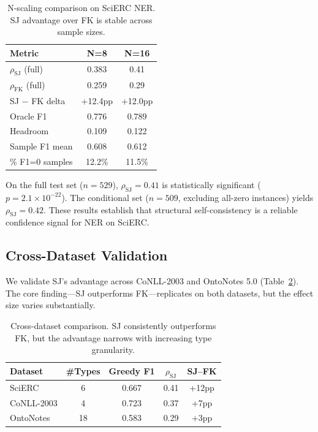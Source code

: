 \documentclass[11pt]{article}
\begin{document}
\begin{table}[t]
\centering
\caption{N-scaling comparison on SciERC NER. SJ advantage over FK is stable across sample sizes.}
\label{tab:n_scaling}
\begin{tabular}{lcc}
\toprule
\textbf{Metric} & \textbf{N=8} & \textbf{N=16} \\
\midrule
$\rho_{\text{SJ}}$ (full)     & 0.383 & 0.41 \\
$\rho_{\text{FK}}$ (full)     & 0.259 & 0.29 \\
SJ $-$ FK delta               & +12.4pp & +12.0pp \\
Oracle F1                     & 0.776 & 0.789 \\
Headroom                      & 0.109 & 0.122 \\
Sample F1 mean                & 0.608 & 0.612 \\
\% F1=0 samples               & 12.2\% & 11.5\% \\
\bottomrule
\end{tabular}
\end{table}

On the full test set ($n{=}529$), $\rho_{\text{SJ}}{=}0.41$ is statistically significant ($p{=}2.1 \times 10^{-22}$).
The conditional set ($n{=}509$, excluding all-zero instances) yields $\rho_{\text{SJ}}{=}0.42$.
These results establish that structural self-consistency is a reliable confidence signal for NER on SciERC.

\subsection{Cross-Dataset Validation}
\label{sec:cross_dataset}

We validate SJ's advantage across CoNLL-2003 and OntoNotes 5.0 (Table~\ref{tab:cross_dataset}).
The core finding---SJ outperforms FK---replicates on both datasets, but the effect size varies substantially.

\begin{table}[t]
\centering
\caption{Cross-dataset comparison. SJ consistently outperforms FK, but the advantage narrows with increasing type granularity.}
\label{tab:cross_dataset}
\begin{tabular}{lcccc}
\toprule
\textbf{Dataset} & \textbf{\#Types} & \textbf{Greedy F1} & \textbf{$\rho_{\text{SJ}}$} & \textbf{SJ--FK} \\
\midrule
SciERC       & 6  & 0.667 & 0.41 & +12pp \\
CoNLL-2003   & 4  & 0.723 & 0.37 & +7pp \\
OntoNotes    & 18 & 0.583 & 0.29 & +3pp \\
\bottomrule
\end{tabular}
\end{table}
\end{document}
